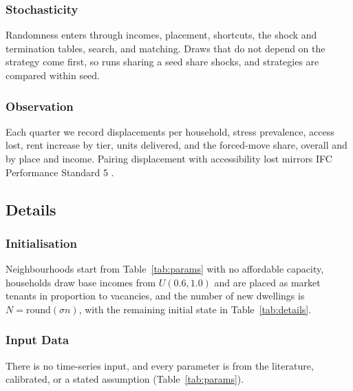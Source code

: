 \documentclass[10pt,a4paper]{article}
\begin{document}
\subsubsection*{Stochasticity}

Randomness enters through incomes, placement, shortcuts, the shock and termination tables, search, and matching. Draws that do not depend on the strategy come first, so runs sharing a seed share shocks, and strategies are compared within seed.

\subsubsection*{Observation}

Each quarter we record displacements per household, stress prevalence, access lost, rent increase by tier, units delivered, and the forced-move share, overall and by place and income. Pairing displacement with accessibility lost mirrors IFC Performance Standard 5 \citep{29}.

\subsection*{Details}

\subsubsection*{Initialisation}

Neighbourhoods start from Table~\ref{tab:params} with no affordable capacity, households draw base incomes from $U(0.6,1.0)$ and are placed as market tenants in proportion to vacancies, and the number of new dwellings is $N=\mathrm{round}(\sigma n)$, with the remaining initial state in Table~\ref{tab:details}.

\subsubsection*{Input Data}

There is no time-series input, and every parameter is from the literature, calibrated, or a stated assumption (Table~\ref{tab:params}).
\end{document}
